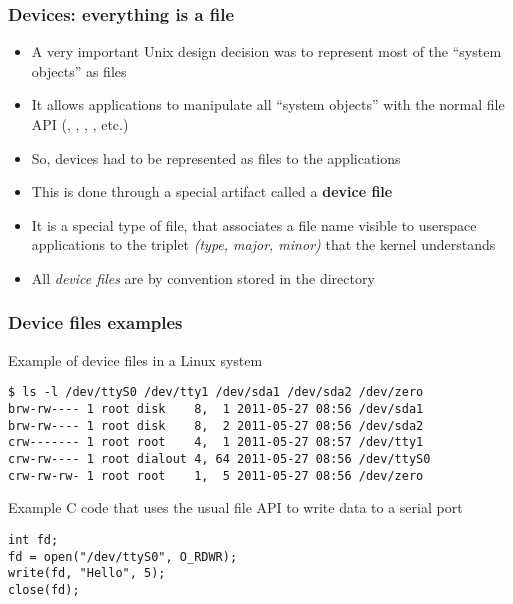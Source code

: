 \begin{frame}
  \frametitle{Devices: everything is a file}
  \begin{itemize}
  \item A very important Unix design decision was to represent most of
    the ``system objects'' as files
  \item It allows applications to manipulate all “system objects” with
    the normal file API (, , ,
    , etc.)
  \item So, devices had to be represented as files to the applications
  \item This is done through a special artifact called a {\bf device
      file}
  \item It is a special type of file, that associates a file name
    visible to userspace applications to the triplet {\em (type,
      major, minor)} that the kernel understands
  \item All {\em device files} are by convention stored in the
     directory
  \end{itemize}
\end{frame}

\begin{frame}[fragile]
\frametitle{Device files examples}

Example of device files in a Linux system

\small
\begin{verbatim}
$ ls -l /dev/ttyS0 /dev/tty1 /dev/sda1 /dev/sda2 /dev/zero
brw-rw---- 1 root disk    8,  1 2011-05-27 08:56 /dev/sda1
brw-rw---- 1 root disk    8,  2 2011-05-27 08:56 /dev/sda2
crw------- 1 root root    4,  1 2011-05-27 08:57 /dev/tty1
crw-rw---- 1 root dialout 4, 64 2011-05-27 08:56 /dev/ttyS0
crw-rw-rw- 1 root root    1,  5 2011-05-27 08:56 /dev/zero
\end{verbatim}
\normalsize

Example C code that uses the usual file API to write data to a serial port

\small
\begin{verbatim}
int fd;
fd = open("/dev/ttyS0", O_RDWR);
write(fd, "Hello", 5);
close(fd);
\end{verbatim}
\end{frame}

